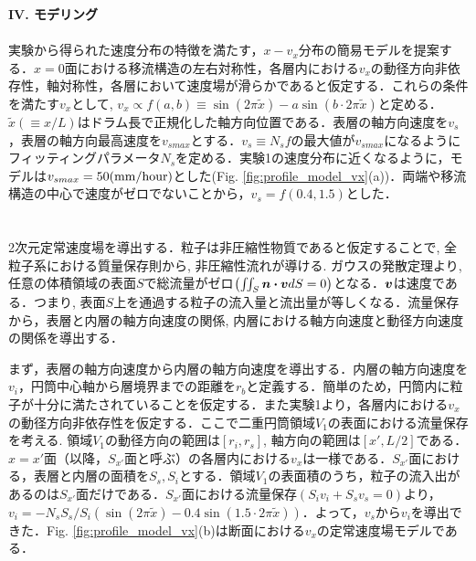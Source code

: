 \documentclass[prl,twocolumn,superscriptaddress]{revtex4}
\begin{document}
{\bf I\hspace{-.1em}V. モデリング} \\
 \\
実験から得られた速度分布の特徴を満たす，$x-v_x$分布の簡易モデルを提案する．$x=0$面における移流構造の左右対称性，各層内における$v_x$の動径方向非依存性，軸対称性，各層において速度場が滑らかであると仮定する．これらの条件を満たす$v_x$として, $v_x \propto f(a, b) \equiv \sin(2\pi \tilde{x})-a\sin(b\cdot 2\pi \tilde{x})$と定める．$\tilde{x}(\equiv x/L)$はドラム長で正規化した軸方向位置である．表層の軸方向速度を$v_s$，表層の軸方向最高速度を$v_{smax}$とする．$v_s \equiv N_sf$の最大値が$v_{smax}$になるようにフィッティングパラメータ$N_s$を定める．実験1の速度分布に近くなるように，モデルは$v_{smax}=50 (\rm{mm/hour})$とした(Fig. \ref{fig:profile_model_vx}(a))．両端や移流構造の中心で速度がゼロでないことから，$v_s=f(0.4, 1.5)$とした．\\
\\
 \\
2次元定常速度場を導出する．粒子は非圧縮性物質であると仮定することで, 全粒子系における質量保存則から, 非圧縮性流れが導ける. ガウスの発散定理より, 任意の体積領域の表面$S$で総流量がゼロ$\qty(\iint\nolimits_S\vb*{n}\vdot\vb*{v}dS = 0)$となる．$\vb*{v}$は速度である．つまり, 表面$S$上を通過する粒子の流入量と流出量が等しくなる．流量保存から，表層と内層の軸方向速度の関係, 内層における軸方向速度と動径方向速度の関係を導出する．

まず，表層の軸方向速度から内層の軸方向速度を導出する．内層の軸方向速度を$v_i$，円筒中心軸から層境界までの距離を$r_b$と定義する．簡単のため，円筒内に粒子が十分に満たされていることを仮定する．また実験1より，各層内における$v_x$の動径方向非依存性を仮定する．ここで二重円筒領域$V_1$の表面における流量保存を考える. 領域$V_1$の動径方向の範囲は$[r_i, r_s]$, 軸方向の範囲は$[x', L/2]$である．$x=x'$面（以降，$S_{x'}$面と呼ぶ）の各層内における$v_x$は一様である．$S_{x'}$面における，表層と内層の面積を$S_s, S_i$とする．領域$V_1$の表面積のうち，粒子の流入出があるのは$S_{x'}$面だけである．$S_{x'}$面における流量保存$(S_iv_i+S_sv_s = 0)$より，$v_i = -N_sS_s/S_i(\sin(2\pi \tilde{x})-0.4\sin(1.5\cdot 2\pi \tilde{x}))$．よって，$v_s$から$v_i$を導出できた．Fig. \ref{fig:profile_model_vx}(b)は断面における$v_x$の定常速度場モデルである．\\
\end{document}
